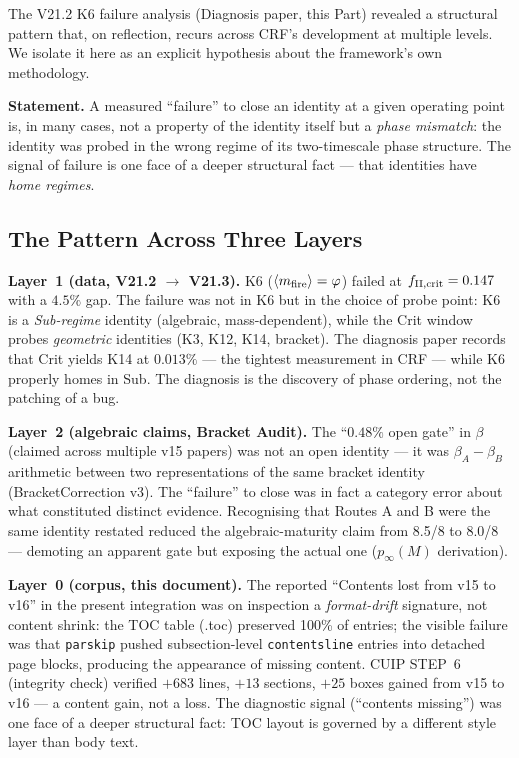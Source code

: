 \documentclass[12pt, a4paper]{article}
\begin{document}
\begin{openqbox}[title={Meta-Pattern: When ``Failure'' Is a Signal of Phase Misalignment}]
The V21.2 K6 failure analysis (Diagnosis paper, this Part) revealed a structural
pattern that, on reflection, recurs across CRF's development at multiple levels.
We isolate it here as an explicit hypothesis about the framework's own
methodology.

\textbf{Statement.} A measured ``failure'' to close an identity at a given
operating point is, in many cases, not a property of the identity itself but a
\emph{phase mismatch}: the identity was probed in the wrong regime of its
two-timescale phase structure. The signal of failure is one face of a deeper
structural fact --- that identities have \emph{home regimes}.
\end{openqbox}

\subsection{The Pattern Across Three Layers}

\textbf{Layer~1 (data, V21.2 $\to$ V21.3).}
K6 ($\langle m_{\rm fire}\rangle = \varphi$) failed at $f_{\rm II,crit} = 0.147$
with a $4.5\%$ gap. The failure was not in K6 but in the choice of probe point:
K6 is a \emph{Sub-regime} identity (algebraic, mass-dependent), while the Crit
window probes \emph{geometric} identities (K3, K12, K14, bracket). The
diagnosis paper records that Crit yields K14 at $0.013\%$ --- the tightest
measurement in CRF --- while K6 properly homes in Sub. The diagnosis is the
discovery of phase ordering, not the patching of a bug.

\textbf{Layer~2 (algebraic claims, Bracket Audit).}
The ``$0.48\%$ open gate'' in $\beta$ (claimed across multiple v15 papers) was
not an open identity --- it was $\beta_A - \beta_B$ arithmetic between two
representations of the same bracket identity (BracketCorrection v3). The
``failure'' to close was in fact a category error about what constituted
distinct evidence. Recognising that Routes A and B were the same identity
restated reduced the algebraic-maturity claim from 8.5/8 to 8.0/8 ---
demoting an apparent gate but exposing the actual one ($p_\infty(M)$ derivation).

\textbf{Layer~0 (corpus, this document).}
The reported ``Contents lost from v15 to v16'' in the present integration was
on inspection a \emph{format-drift} signature, not content shrink: the TOC
table (.toc) preserved 100\% of entries; the visible failure was that
\texttt{parskip} pushed subsection-level \texttt{contentsline} entries into
detached page blocks, producing the appearance of missing content. CUIP
STEP~6 (integrity check) verified $+683$ lines, $+13$ sections, $+25$ boxes
gained from v15 to v16 --- a content gain, not a loss. The diagnostic signal
(``contents missing'') was one face of a deeper structural fact: TOC layout is
governed by a different style layer than body text.
\end{document}
